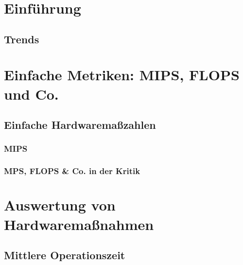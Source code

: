 \section{Einführung}
\subsection{Trends}


\section{Einfache Metriken: MIPS, FLOPS und Co.}


\subsection{Einfache Hardwaremaßzahlen}

\subsubsection{MIPS}
\subsubsection{MPS, FLOPS \& Co. in der Kritik}

\section{Auswertung von Hardwaremaßnahmen}

\subsection{Mittlere Operationszeit}

